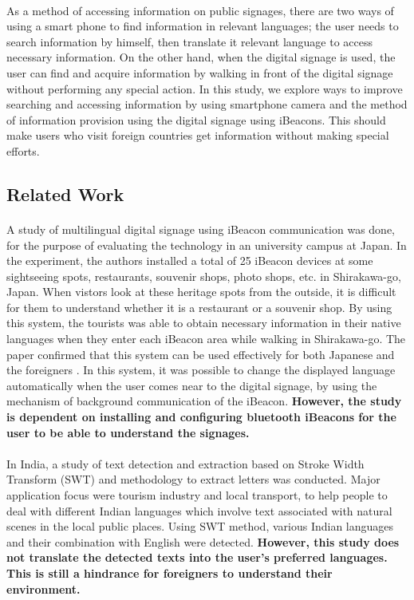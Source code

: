 \documentclass[12pt]{article}
\begin{document}
\paragraph{}As a method of accessing information on public signages, there are two ways of using a smart phone to find information in relevant languages; the user needs to search information by himself, then translate it relevant language to access necessary information. On the other hand, when the digital signage is used, the user can find and acquire information by walking in front of the digital signage without performing any special action. In this study, we explore ways to improve searching and accessing information by using smartphone camera and the method of information provision using the digital signage using iBeacons. This should make users who visit foreign countries get information without making special efforts. 

\subsection{Related Work}

\paragraph{} A study of multilingual digital signage using iBeacon communication was done, for the purpose of evaluating the technology in an university campus at Japan.  \cite{one} In the experiment, the authors installed a total of 25 iBeacon devices at some sightseeing spots, restaurants, souvenir shops, photo shops, etc. in Shirakawa-go, Japan. When vistors look at these heritage spots from the outside, it is difficult for them to understand whether it is a restaurant or a souvenir shop. By using this system, the tourists was able to obtain necessary information in their native languages when they enter each iBeacon area while walking in Shirakawa-go. The paper confirmed that this system can be used effectively for both Japanese and the foreigners \cite{one}.  In this system, it was possible to change the displayed language automatically when the user comes near to the digital signage, by using the mechanism of background communication of the iBeacon. \textbf{However, the study is dependent on installing and configuring bluetooth iBeacons for the user to be able to understand the signages.}

\paragraph{}In India, a study of text detection and extraction based on Stroke Width Transform (SWT) and methodology to extract letters was conducted. \cite{india} Major application focus were tourism industry and local transport, to help people to deal with different Indian languages which involve text associated with natural scenes in the local public places. Using SWT method, various Indian languages and their combination with English were detected. \textbf{However, this study does not translate the detected texts into the user's preferred languages. This is still a hindrance for foreigners to understand their environment.}
\end{document}
